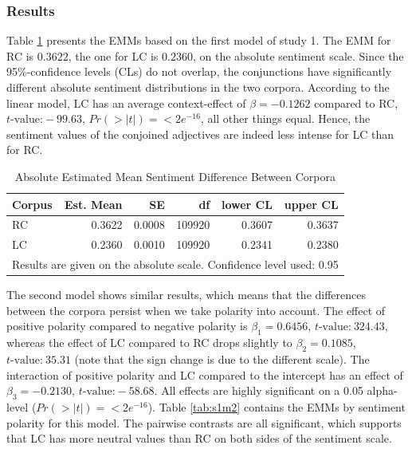 \documentclass{article}
\begin{document}
\subsubsection{Results}

Table \ref{tab:s1m1} presents the EMMs based on the first model of study 1. The EMM for RC is $0.3622$, the one for LC is $0.2360$, on the absolute sentiment scale. Since the 95\%-confidence levels (CLs) do not overlap, the conjunctions have significantly different absolute sentiment distributions in the two corpora. According to the linear model, LC has an average context-effect of $\beta = -0.1262$ compared to RC, $t\text{-value:} -99.63$, $Pr(>|t|) = <2e^{-16}$, all other things equal.  Hence, the sentiment values of the conjoined adjectives are indeed less intense for LC than for RC.

\begin{table}[!h]
\centering
\begin{tabular}{lrrrrr}
  \hline
Corpus & Est. Mean & SE & df & lower CL & upper CL \\ 
  \hline
RC & 0.3622 & 0.0008 & 109920 & 0.3607 & 0.3637 \\ 
  LC & 0.2360 & 0.0010 & 109920 & 0.2341 & 0.2380 \\ 
   \hline
\multicolumn{6}{l}{{\footnotesize Results are given on the absolute scale. Confidence level used: 0.95}}\\
\end{tabular}
\caption{Absolute Estimated Mean Sentiment Difference Between Corpora}
\label{tab:s1m1}
\end{table}

The second model shows similar results, which means that the differences between the corpora persist when we take polarity into account. The effect of positive polarity compared to negative polarity is $\beta_1 = 0.6456$, $t\text{-value:}\ 324.43$, whereas the effect of LC compared to RC drops slightly to $\beta_2 = 0.1085$, $t\text{-value:}\ 35.31$ (note that the sign change is due to the different scale). The interaction of positive polarity and LC compared to the intercept has an effect of $\beta_3 = -0.2130$, $t\text{-value:}-58.68$. All effects are highly significant on a 0.05 alpha-level ($Pr(>|t|) = <2e^{-16}$). Table \ref{tab:s1m2} contains the EMMs by sentiment polarity for this model. The pairwise contrasts are all significant, which supports that LC has more neutral values than RC on both sides of the sentiment scale.
\end{document}
